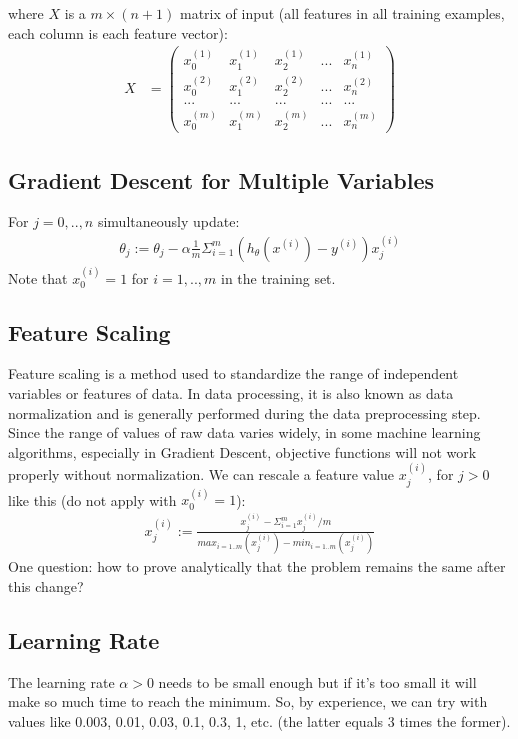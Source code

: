where $X$ is a $m \times (n+1)$ matrix of input (all features in all training examples, each column is each feature vector):
\begin{align} \label{form:matX}
X &= \begin{pmatrix}
x_0^{(1)} & x_1^{(1)} & x_2^{(1)} & ... & x_n^{(1)} \\
x_0^{(2)} & x_1^{(2)} & x_2^{(2)} & ... & x_n^{(2)} \\
...       & ...       & ...       & ... & ...\\
x_0^{(m)} & x_1^{(m)} & x_2^{(m)} & ... & x_n^{(m)}
\end{pmatrix}
\end{align}

\subsection{Gradient Descent for Multiple Variables}
For $j = 0,..,n $ simultaneously update:
\begin{align}
\label{form:w2mulVarGradDesc}
\theta_j := \theta_j - \alpha \frac{1}{m} \Sigma_{i=1}^{m} (h_{\theta}(x^{(i)}) - y^{(i)})x_j^{(i)}  
\end{align}
Note that $x_0^{(i)} = 1$ for $i = 1,..,m$ in the training set.

\subsection{Feature Scaling}
Feature scaling is a method used to standardize the range of independent variables or features of data. In data processing, it is also known as data normalization and is generally performed during the data preprocessing step. Since the range of values of raw data varies widely, in some machine learning algorithms, especially in Gradient Descent, objective functions will not work properly without normalization. We can rescale a feature value $x_j^{(i)}$, for $j > 0$ like this (do not apply with $x_0^{(i)} = 1$):
\begin{align}
\label{form:w2FeatScale}
x_j^{(i)} := \frac{x_j^{(i)} - \Sigma_{i=1}^{m} x_j^{(i)}/m}{max_{i=1..m}(x_j^{(i)}) - min_{i=1..m}(x_j^{(i)})} 
\end{align}
One question: how to prove analytically that the problem remains the same after this change?

\subsection{Learning Rate}
The learning rate $\alpha > 0$ needs to be small enough but if it's too small it will make so much time to reach the minimum. So, by experience, we can try with values like 0.003, 0.01, 0.03, 0.1, 0.3, 1, etc. (the latter equals 3 times the former).


